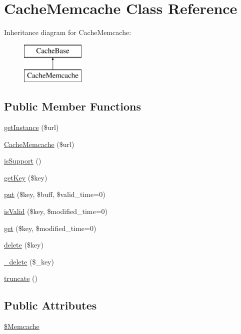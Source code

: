 \hypertarget{classCacheMemcache}{}\section{Cache\+Memcache Class Reference}
\label{classCacheMemcache}
Inheritance diagram for Cache\+Memcache\+:\begin{figure}[H]
\begin{center}
\leavevmode
\includegraphics[height=2.000000cm]{classCacheMemcache}
\end{center}
\end{figure}
\subsection*{Public Member Functions}
\begin{DoxyCompactItemize}
\item 
\hyperlink{classCacheMemcache_a951aa78ba49fdb971def3e2bb8b7db2e}{get\+Instance} (\$url)
\item 
\hyperlink{classCacheMemcache_ac4810e2e11716523e49df5a14b2fc215}{Cache\+Memcache} (\$url)
\item 
\hyperlink{classCacheMemcache_a4ea35bdd7cc26faa01996dbbc162720f}{is\+Support} ()
\item 
\hyperlink{classCacheMemcache_a27f400a936cc3efb152acc12edb379e1}{get\+Key} (\$key)
\item 
\hyperlink{classCacheMemcache_aaf8fbd3ad05138296cb522fe8c133017}{put} (\$key, \$buff, \$valid\+\_\+time=0)
\item 
\hyperlink{classCacheMemcache_af0882957fc5b20e7fb70aeae652920e8}{is\+Valid} (\$key, \$modified\+\_\+time=0)
\item 
\hyperlink{classCacheMemcache_a9a3db7b30c229677ce7c331aa41f9e9a}{get} (\$key, \$modified\+\_\+time=0)
\item 
\hyperlink{classCacheMemcache_aca057fd092e1a938410a20e16d2d2d7f}{delete} (\$key)
\item 
\hyperlink{classCacheMemcache_a8ac0c5d0703aaeaabec2c478984d43fa}{\+\_\+delete} (\$\+\_\+key)
\item 
\hyperlink{classCacheMemcache_a064b47c5872cde9ff686b148bf005849}{truncate} ()
\end{DoxyCompactItemize}
\subsection*{Public Attributes}
\begin{DoxyCompactItemize}
\item 
\hyperlink{classCacheMemcache_a56ac8c11dec3851aee654babe49d20f8}{\$\+Memcache}
\end{DoxyCompactItemize}


